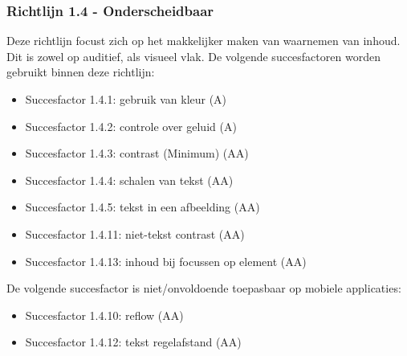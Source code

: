 \subsubsection{Richtlijn 1.4 - Onderscheidbaar}
Deze richtlijn focust zich op het makkelijker maken van waarnemen van inhoud. Dit is zowel op auditief, als visueel vlak.  De volgende succesfactoren worden gebruikt binnen deze richtlijn:
\begin{itemize}
    \item  Succesfactor 1.4.1:  gebruik van kleur (A)
    \item Succesfactor 1.4.2:  controle over geluid (A)
    \item Succesfactor 1.4.3:  contrast (Minimum) (AA)
    \item Succesfactor 1.4.4:  schalen van tekst (AA)
    \item Succesfactor 1.4.5:  tekst in een afbeelding (AA)
    \item Succesfactor 1.4.11:  niet-tekst contrast (AA)
    \item Succesfactor 1.4.13:  inhoud bij focussen op element (AA)
\end{itemize}

De volgende succesfactor is niet/onvoldoende toepasbaar op mobiele applicaties: \begin{itemize}
    \item Succesfactor 1.4.10:  reflow (AA)
    \item Succesfactor 1.4.12: tekst regelafstand (AA)
\end{itemize}



